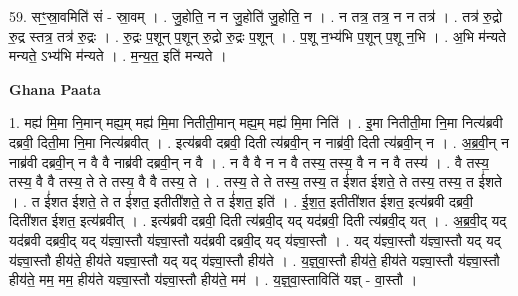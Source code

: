 \documentclass[17pt]{extarticle}
\begin{document}
59. सꣳ॒॒स्रा॒वमिति॑ सं - स्रा॒वम् । . जु॒होति॒ न न जु॒होति॑ जु॒होति॒ न । . न तत्र॒ तत्र॒ न न तत्र॑ । . तत्र॑ रु॒द्रो रु॒द्र स्तत्र॒ तत्र॑ रु॒द्रः । . रु॒द्रः प॒शून् प॒शून् रु॒द्रो रु॒द्रः प॒शून् । . प॒शू न॒भ्य॑भि प॒शून् प॒शू न॒भि । . अ॒भि म॑न्यते मन्यते॒ ऽभ्य॑भि म॑न्यते । . म॒न्य॒त॒ इति॑ मन्यते । \newline

\textbf{Ghana Paata } \newline

1. मह्य॑ मि॒मा नि॒मान् मह्य॒म् मह्य॑ मि॒मा नितीती॒मान् मह्य॒म् मह्य॑ मि॒मा निति॑ । . इ॒मा नितीती॒मा नि॒मा नित्य॑ब्रवी दब्रवी॒ दिती॒मा नि॒मा नित्य॑ब्रवीत् । . इत्य॑ब्रवी दब्रवी॒ दिती त्य॑ब्रवी॒न् न नाब्र॑वी॒ दिती त्य॑ब्रवी॒न् न । . अ॒ब्र॒वी॒न् न नाब्र॑वी दब्रवी॒न् न वै वै नाब्र॑वी दब्रवी॒न् न वै । . न वै वै न न वै तस्य॒ तस्य॒ वै न न वै तस्य॑ । . वै तस्य॒ तस्य॒ वै वै तस्य॒ ते ते तस्य॒ वै वै तस्य॒ ते । . तस्य॒ ते ते तस्य॒ तस्य॒ त ई॑शत ईशते॒ ते तस्य॒ तस्य॒ त ई॑शते । . त ई॑शत ईशते॒ ते त ई॑शत॒ इतीती॑शते॒ ते त ई॑शत॒ इति॑ । . ई॒श॒त॒ इतीती॑शत ईशत॒ इत्य॑ब्रवी दब्रवी॒ दिती॑शत ईशत॒ इत्य॑ब्रवीत् । . इत्य॑ब्रवी दब्रवी॒ दिती त्य॑ब्रवी॒द् यद् यद॑ब्रवी॒ दिती त्य॑ब्रवी॒द् यत् । . अ॒ब्र॒वी॒द् यद् यद॑ब्रवी दब्रवी॒द् यद् य॑ज्ञ्वा॒स्तौ य॑ज्ञ्वा॒स्तौ यद॑ब्रवी दब्रवी॒द् यद् य॑ज्ञ्वा॒स्तौ । . यद् य॑ज्ञ्वा॒स्तौ य॑ज्ञ्वा॒स्तौ यद् यद् य॑ज्ञ्वा॒स्तौ हीय॑ते॒ हीय॑ते यज्ञ्वा॒स्तौ यद् यद् य॑ज्ञ्वा॒स्तौ हीय॑ते । . य॒ज्ञ्॒वा॒स्तौ हीय॑ते॒ हीय॑ते यज्ञ्वा॒स्तौ य॑ज्ञ्वा॒स्तौ हीय॑ते॒ मम॒ मम॒ हीय॑ते यज्ञ्वा॒स्तौ य॑ज्ञ्वा॒स्तौ हीय॑ते॒ मम॑ । . य॒ज्ञ्॒वा॒स्ताविति॑ यज्ञ् - वा॒स्तौ । \newline
\end{document}
